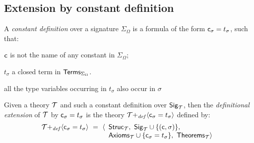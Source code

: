 \subsection{Extension by constant definition}
\label{defs}

A {\it constant definition\/} over a
signature $\Sigma_{\Omega}$ is a formula of the form
${\sf c}_{\sigma} = t_{\sigma}$, such that:
\begin{myenumerate}

\item
${\sf c}$ is not the name of any constant in $\Sigma_{\Omega}$;

\item
$t_{\sigma}$ a closed term in ${\sf Terms}_{\Sigma_{\Omega}}$.

\item
all the type variables occurring in $t_\sigma$ also occur in $\sigma$

\end{myenumerate}

Given a theory $\cal T$ and such a constant definition over ${\sf
Sig}_{\cal T}$, then the {\em definitional extension\/} of ${\cal T}$
by ${\sf c}_{\sigma}=t_{\sigma}$ is the theory ${\cal T}{+_{\it
def}}\langle
{\sf c}_{\sigma}=t_{\sigma}\rangle$ defined by:
\[
{\cal T}{+_{\it def}}\langle
{\sf c}_{\sigma}=t_{\sigma}\rangle\  =\ \langle
\begin{array}[t]{l}
{\sf Struc}_{\cal T},\
{\sf Sig}_{\cal T}\cup\{({\sf c},\sigma)\},\\
{\sf Axioms}_{\cal T}\cup\{
{\sf c}_{\sigma}=t_{\sigma} \},\
{\sf Theorems}_{\cal T}\rangle
\end{array}
\]

